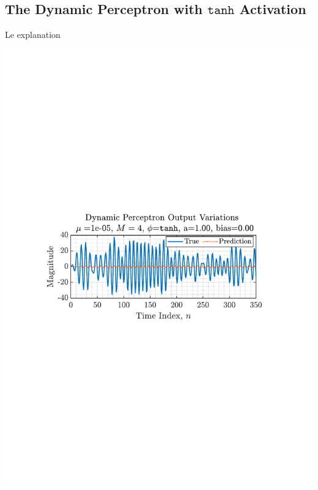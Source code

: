 \documentclass[12pt]{article}
\begin{document}
	\subsection{The Dynamic Perceptron with $\texttt{tanh}$ Activation} \label{sec: 4-2-dynamic-perc}
		\begin{minipage}[b]{0.49\textwidth}
			Le explanation
		\end{minipage}%
		\begin{minipage}{0.04\textwidth}
			\hspace*{0.04\textwidth}
		\end{minipage}%
		\begin{minipage}{0.49\textwidth}
			\centering
			\includegraphics[trim={2.2cm 11.2cm 3.15cm  11.2cm}, clip, width=\textwidth]{../MATLAB/figures/q4_2_fig01.pdf} 
			
			\captionsetup{justification=centering}
			\label{fig: 4-2}
		\end{minipage}%
\end{document}
